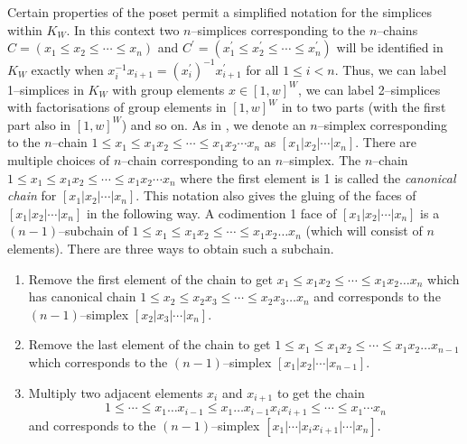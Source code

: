 \documentclass[class=article, crop=false]{standalone}
\begin{document}
Certain properties of the poset permit a simplified notation for the simplices within $K_{W}$. In this context two $n$--simplices corresponding to the $n$--chains $C=(x_1 \leq x_2 \leq \cdots \leq x_n)$ and $C^\prime = (x_1^\prime \leq x_2^\prime \leq \cdots \leq x_n^\prime)$ will be identified in $K_W$ exactly when $x_i^{-1}x_{i+1} = (x^\prime_i)^{-1}x^\prime_{i+1}$ for all $1\leq i <n$. Thus, we can label 1--simplices in $K_{W}$ with group elements $x \in [1,w]^W$, we can label 2--simplices with factorisations of group elements in $[1,w]^W$ in to two parts (with the first part also in $[1,w]^W$) and so on.
As in \cite[Definition 2.8]{paolini_salvetti_kpi1_2021}, we denote an $n$--simplex corresponding to the $n$--chain $1 \leq x_1 \leq x_1x_2 \leq \cdots \leq x_1x_2\cdots x_n$ as $[x_1 | x_2 | \cdots | x_n]$. There are multiple choices of $n$--chain corresponding to an $n$--simplex.
The $n$--chain $1 \leq x_1 \leq x_1x_2 \leq \cdots \leq x_1x_2\cdots x_n$ where the first element is 1 is called the \emph{canonical chain} for $[x_1 | x_2 | \cdots | x_n]$. This notation also gives the gluing of the faces of $[x_1 | x_2 | \cdots | x_n]$ in the following way.
A codimention 1 face of $[x_1 | x_2 | \cdots | x_n]$ is a $(n-1)$--subchain of $1 \leq x_1 \leq x_1x_2 \leq \cdots \leq x_1x_2\ldots x_n$ (which will consist of $n$ elements). There are three ways to obtain such a subchain.
\begin{enumerate}
    \item \label{item:gluing_step_1} Remove the first element of the chain to get $x_1 \leq x_1x_2 \leq \cdots \leq x_1x_2\ldots x_n$ which has canonical chain $1 \leq x_2 \leq x_2x_3 \leq \cdots \leq x_2x_3\ldots x_n$ and corresponds to the $(n-1)$--simplex $[x_2 | x_3 | \cdots | x_n]$.
    \item \label{item:gluing_step_2} Remove the last element of the chain to get $1 \leq x_1 \leq x_1x_2 \leq \cdots \leq x_1x_2\ldots x_{n-1}$ which corresponds to the $(n-1)$--simplex $[x_1 | x_2 | \cdots | x_{n-1}]$.
    \item \label{item:gluing_step_3} Multiply two adjacent elements $x_i$ and $x_{i+1}$ to get the chain
    \begin{equation*}
        1 \leq \cdots \leq x_1 \ldots x_{i-1} \leq x_1 \ldots x_{i-1}x_ix_{i+1} \leq \cdots \leq x_1\cdots x_n
    \end{equation*}
    and corresponds to the $(n-1)$--simplex $[x_1| \cdots | x_ix_{i+1} | \cdots |x_n]$.
\end{enumerate}
\end{document}
